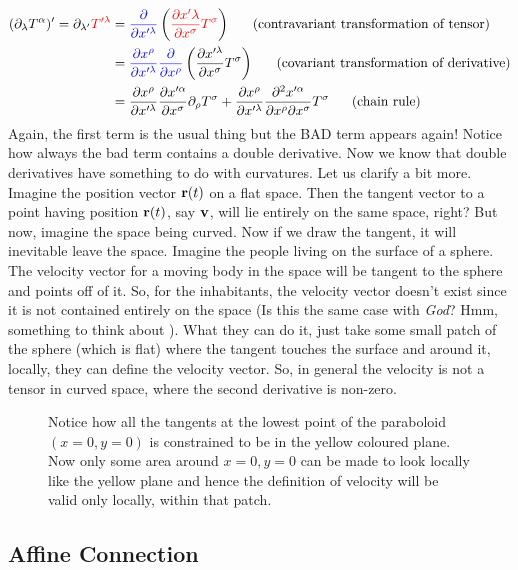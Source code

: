 \begin{align*}
    (\partial_\lambda T^\alpha)' = \partial_{\lambda'}\mathcolor{red}{T'^\lambda}&= \mathcolor{blue}{\frac{\partial}{\partial x'^\lambda}}\brac{\mathcolor{red}{\pdv{x'\lambda}{x^\sigma}T^\sigma}} \quad \ \ (\text{contravariant transformation of tensor})\\
    &= \mathcolor{blue}{\pdv{x^\rho}{x'^\lambda}\frac{\partial}{\partial x^\rho}}\brac{{\pdv{x'^\lambda}{x^\sigma}T^\sigma}}\quad \ \ (\text{covariant transformation of derivative})\\
    &= \pdv{x^\rho}{x'^\lambda}\pdv{x'^\alpha}{x^\sigma}\partial_\rho T^\sigma + \pdv{x^\rho}{x'^\lambda}\pdv{x'^\alpha}{x^\rho}{x^\sigma}T^\sigma \quad \ \ (\text{chain rule})
\end{align*}
Again, the first term is the usual thing but the BAD term appears again! Notice how always the bad term contains a double derivative. Now we know that double derivatives have something to do with curvatures. Let us clarify a bit more.\\[0.3cm]
Imagine the position vector $\boldsymbol{\mathbf{r}}(t)$ on a flat space. Then the tangent vector to a point having position $\boldsymbol{\mathbf{r}}(t)$, say $\boldsymbol{\mathbf{v}}$, will lie entirely on the same space, right? But now, imagine the space being curved. Now if we draw the tangent, it will inevitable leave the space. Imagine the people living on the surface of a sphere. The velocity vector for a moving body in the space will be tangent to the sphere and points off of it. So, for the inhabitants, the velocity vector doesn't exist since it is not contained entirely on the space (Is this the same case with \textit{God}? Hmm, something to think about ). What they can do it, just take some small patch of the sphere (which is flat) where the tangent touches the surface and around it, locally, they can define the velocity vector. So, in general the velocity is not a tensor in curved space, where the second derivative is non-zero. 

\begin{figure}[H]
    \centering 
    
    \caption{Notice how all the tangents at the lowest point of the paraboloid $(x=0,y=0)$ is constrained to be in the yellow coloured plane. Now only some area around $x=0,y=0$ can be made to look locally like the yellow plane and hence the definition of velocity will be valid only locally, within that patch.   }
\end{figure}
\subsection{Affine Connection}
